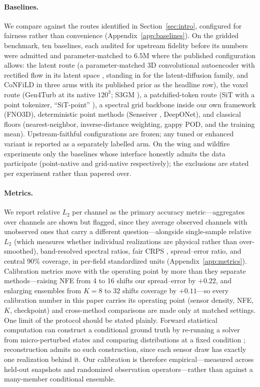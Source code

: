 \documentclass{article} %
\begin{document}
\paragraph{Baselines.}
We compare against the routes identified in Section~\ref{sec:intro}, configured for fairness rather than convenience (Appendix~\ref{app:baselines}). On the gridded benchmark, ten baselines, each audited for upstream fidelity before its numbers were admitted and parameter-matched to $6.5$M where the published configuration allows: the latent route (a parameter-matched 3D convolutional autoencoder with rectified flow in its latent space \citep[LDM-style;][]{rombach2022high}, standing in for the latent-diffusion family, and CoNFiLD \citep{du2024confild} in three arms with its published prior as the headline row), the voxel route (Gen4Turb \citep{oommen2026turbulent} at its native $120^3$; S3GM \citep{li2024s3gm}), a patchified-token route (SiT with a point tokenizer, ``SiT-point'' \citep{ma2024sit}), a spectral grid backbone inside our own framework (FNO3D), deterministic point methods (Senseiver \citep{santos2023senseiver}, DeepONet), and classical floors (nearest-neighbor, inverse-distance weighting, gappy POD, and the training mean). Upstream-faithful configurations are frozen; any tuned or enhanced variant is reported as a separately labelled arm. On the wing and wildfire experiments only the baselines whose interface honestly admits the data participate (point-native and grid-native respectively); the exclusions are stated per experiment rather than papered over.

\paragraph{Metrics.}
We report relative $L_2$ per channel as the primary accuracy metric---aggregates over channels are shown but flagged, since they average observed channels with unobserved ones that carry a different question---alongside single-sample relative $L_2$ (which measures whether individual realizations are physical rather than over-smoothed), band-resolved spectral ratios, fair CRPS \citep{gneiting2007strictly}, spread--error ratio, and central 90\% coverage, in per-field standardized units (Appendix~\ref{app:metrics}). Calibration metrics move with the operating point by more than they separate methods---raising NFE from 4 to 16 shifts our spread--error by $+0.22$, and enlarging ensembles from $K{=}8$ to $32$ shifts coverage by $+0.11$---so every calibration number in this paper carries its operating point (sensor density, NFE, $K$, checkpoint) and cross-method comparisons are made only at matched settings. One limit of the protocol should be stated plainly. Forward statistical computation can construct a conditional ground truth by re-running a solver from micro-perturbed states and comparing distributions at a fixed condition \citep{raonic2026gencfd}; reconstruction admits no such construction, since each sensor draw has exactly one realization behind it. Our calibration is therefore empirical---measured across held-out snapshots and randomized observation operators---rather than against a many-member conditional ensemble.
\end{document}
